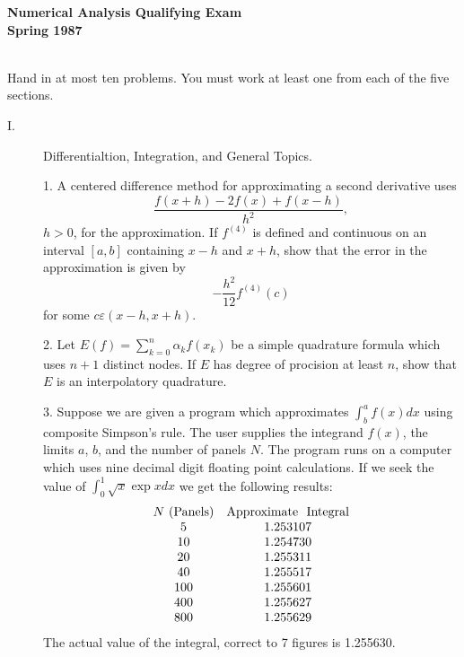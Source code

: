 \documentclass{article}
\begin{document}






\begin{center}\begin{LARGE}
{\bf Numerical Analysis Qualifying Exam}\\ 
{\bf Spring 1987}\\ \end{LARGE}
\end{center}
\vspace{0.1in}
\noindent\hrulefill\\

Hand in at most ten problems. You must work at least one from each of the
five sections.

\begin{description}
\item[I.]
Differentialtion, Integration, and General Topics.

\item[\quad] 1.
A centered difference method for approximating a second derivative uses
$$\frac{f(x+h) - 2f(x) + f(x-h)}{h^2},$$
$h>0$, for the approximation. If $f^{(4)}$ is defined and continuous on an
interval $[a,b]$ containing $x-h$ and $x+h$, show that the error in the
approximation is given by
$$-\frac{h^2}{12} f^{(4)} (c)$$
for some $c\varepsilon (x-h, x+h)$.

\item[\quad] 2.
Let $E(f) = \sum^n_{k=0} \alpha_k f(x_k)$ be a simple quadrature formula
which uses $n+1$ distinct nodes. If $E$ has degree of procision at least $n$,
show that $E$ is an interpolatory quadrature.

\item[\quad] 3.
Suppose we are given a program which approximates $\int^a_b f(x) dx$ using
composite Simpson's rule. The user supplies the integrand $f(x)$, the
limits $a$, $b$, and the number of panels $N$. The program runs on a computer
which uses nine decimal digit floating point calculations. If we seek the
value of $\int^1_0 \sqrt {x} \exp xdx$ we get the following results:
$$\begin{array}{cc}
        N \hbox{\ (Panels)} & \hbox{Approximate\ } \hbox{\ Integral} \\
        5 & 1.253107 \\
        10 & 1.254730 \\
        20 & 1.255311 \\
        40 & 1.255517 \\
        100 & 1.255601 \\
        400 & 1.255627 \\
        800 & 1.255629
        \end{array} $$
The actual value of the integral, correct to 7 figures is 1.255630.


\end{description}
\end{document}
